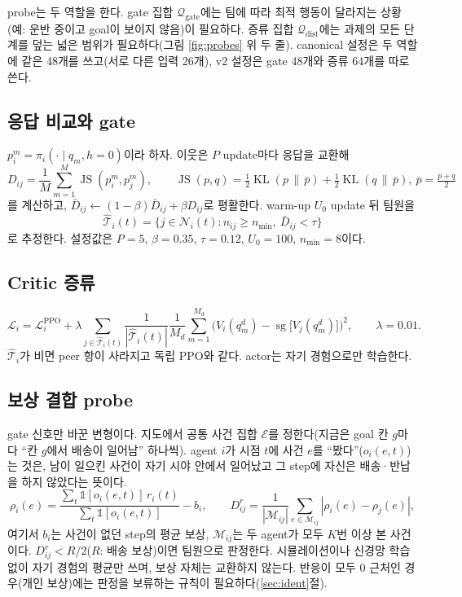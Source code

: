 \documentclass[10pt]{article}
\newcommand{\JS}{\operatorname{JS}}
\newcommand{\KL}{\operatorname{KL}}
\newcommand{\sg}{\operatorname{sg}}
\begin{document}
probe는 두 역할을 한다. gate 집합 $\mathcal{Q}_{\mathrm{gate}}$에는 팀에 따라 최적 행동이 달라지는 상황(예: 운반 중이고 goal이 보이지 않음)이 필요하다. 증류 집합 $\mathcal{Q}_{\mathrm{dist}}$에는 과제의 모든 단계를 덮는 넓은 범위가 필요하다(그림 \ref{fig:probes} 위 두 줄).
canonical 설정은 두 역할에 같은 48개를 쓰고(서로 다른 입력 26개), v2 설정은 gate 48개와 증류 64개를 따로 쓴다.

\subsection{응답 비교와 gate}
$p_i^m = \pi_i(\cdot \mid q_m, h = 0)$이라 하자. 이웃은 $P$ update마다 응답을 교환해
\[
  D_{ij} = \frac{1}{M}\sum_{m=1}^{M} \JS(p_i^m, p_j^m), \qquad
  \JS(p,q) = \tfrac12 \KL(p \,\|\, \bar p) + \tfrac12 \KL(q \,\|\, \bar p),\ \bar p = \tfrac{p+q}{2}
\]
를 계산하고, $\bar D_{ij} \leftarrow (1-\beta)\bar D_{ij} + \beta D_{ij}$로 평활한다. warm-up $U_0$ update 뒤 팀원을
\[
  \hat{\mathcal{T}}_i(t) = \{ j \in \mathcal{N}_i(t) : n_{ij} \ge n_{\min},\ \bar D_{ij} < \tau \}
\]
로 추정한다. 설정값은 $P = 5$, $\beta = 0.35$, $\tau = 0.12$, $U_0 = 100$, $n_{\min} = 8$이다.

\subsection{Critic 증류}
\[
  \mathcal{L}_i = \mathcal{L}^{\mathrm{PPO}}_i + \lambda \sum_{j \in \hat{\mathcal{T}}_i(t)} \frac{1}{|\hat{\mathcal{T}}_i(t)|}
  \frac{1}{M_d}\sum_{m=1}^{M_d} \Big( V_i(q^d_m) - \sg\big[V_j(q^d_m)\big] \Big)^2, \qquad \lambda = 0.01.
\]
$\hat{\mathcal{T}}_i$가 비면 peer 항이 사라지고 독립 PPO와 같다. actor는 자기 경험으로만 학습한다.

\subsection{보상 결합 probe}
\label{sec:coupling}
gate 신호만 바꾼 변형이다. 지도에서 공통 사건 집합 $\mathcal{E}$를 정한다(지금은 goal 칸 $g$마다 ``칸 $g$에서 배송이 일어남'' 하나씩).
agent $i$가 시점 $t$에 사건 $e$를 ``봤다''($o_i(e,t)$)는 것은, 남이 일으킨 사건이 자기 시야 안에서 일어났고 그 step에 자신은 배송·반납을 하지 않았다는 뜻이다.
\[
  \rho_i(e) = \frac{\sum_t \mathbb{1}[o_i(e,t)]\, r_i(t)}{\sum_t \mathbb{1}[o_i(e,t)]} - b_i, \qquad
  D^r_{ij} = \frac{1}{|\mathcal{M}_{ij}|}\sum_{e \in \mathcal{M}_{ij}} |\rho_i(e) - \rho_j(e)|,
\]
여기서 $b_i$는 사건이 없던 step의 평균 보상, $\mathcal{M}_{ij}$는 두 agent가 모두 $K$번 이상 본 사건이다. $D^r_{ij} < R/2$($R$: 배송 보상)이면 팀원으로 판정한다.
시뮬레이션이나 신경망 학습 없이 자기 경험의 평균만 쓰며, 보상 자체는 교환하지 않는다. 반응이 모두 0 근처인 경우(개인 보상)에는 판정을 보류하는 규칙이 필요하다(\ref{sec:ident}절).
\end{document}
